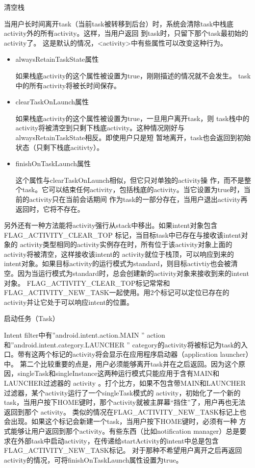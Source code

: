 \documentclass[a4paper, 11pt]{article}
\begin{document}
清空栈

当用户长时间离开task（当前task被转移到后台）时，系统会清除task中栈底activity外的所有activity。这样，当用户返回 到task时，只留下那个task最初始的activity了。
这是默认的情况，<activity>中有些属性可以改变这种行为。
\begin{itemize}
    \item alwaysRetainTaskState属性

如果栈底activity的这个属性被设置为true，刚刚描述的情况就不会发生。 task中的所有activity将被长时间保存。

\item clearTaskOnLaunch属性

如果栈底activity的这个属性被设置为true，一旦用户离开task，则 task栈中的activity将被清空到只剩下栈底activity。这种情况刚好与alwaysRetainTaskState相反。即使用户只是短 暂地离开，task也会返回到初始状态（只剩下栈底acitivty）。
\item finishOnTaskLaunch属性

这个属性与clearTaskOnLaunch相似，但它只对单独的activity操 作，而不是整个task。它可以结束任何activity，包括栈底的activity。当它设置为true时，当前的activity只在当前会话期间 作为task的一部分存在，当用户退出activity再返回时，它将不存在。
\end{itemize}

另外还有一种方法能将activity强行从stack中移出。如果intent对象包含FLAG_ACTIVITY_CLEAR_TOP 标记，当目标task中已存在与接收该intent对象的 activity类型相同的activity实例存在时，所有位于该activity对象上面的activity将被清空，这样接收该intent的 activity就位于栈顶，可以响应到来的intent对象。如果目标activity的运行模式为standard，则目标activtiy也会被清 空。因为当运行模式为standard时，总会创建新的activity对象来接收到来的intent对象。
FLAG_ACTIVITY_CLEAR_TOP标记常常和FLAG_ACTIVITY_NEW_TASK一起使用。用2个标记可以定位已存在的 activity并让它处于可以响应intent的位置。


启动任务（Task）

Intent filter中有”android.intent.action.MAIN ” action和”android.intent.category.LAUNCHER ” category的activity将被标记为task的入口。带有这两个标记的activity将会显示在应用程序启动器（application launcher）中。
第二个比较重要的点是，用户必须能够离开task并在之后返回。因为这个原因，singleTask和singleInstance这两种运行模式只能应用于含有MAIN和LAUNCHER过滤器的 activity 。打个比方，如果不包含带MAIN和LAUNCHER过滤器，某个activity运行了一个singleTask模式的 activity，初始化了一个新的task，当用户按下HOME键时，那个activity就被主屏幕“挡住”了，用户再也无法返回到那个 activity。
类似的情况在FLAG_ACTIVITY_NEW_TASK标记上也会出现。如果这个标记会新建一个task，当用户按下HOME键时，必须有一种 方式能够让用户返回到那个activity。有些东西（比如notification manager）总是要求在外部task中启动activity，在传递给startActivity的intent中总是包含 FLAG_ACTIVITY_NEW_TASK标记。
对于那种不希望用户离开之后再返回activity的情况，可将finishOnTaskLaunch属性设置为true。
\end{document}
